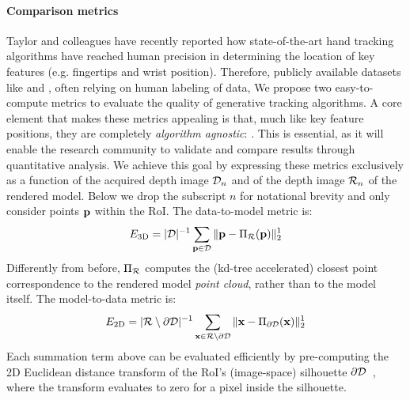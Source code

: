 \paragraph{Comparison metrics}
Taylor and colleagues  have recently reported how state-of-the-art hand tracking algorithms have reached human precision in determining the location of key features (e.g. fingertips and wrist position). 
Therefore, publicly available datasets like \cite{tompson2014real} and \cite{sridhar2013multicam}, often relying on human labeling of data, 
% 
We propose two easy-to-compute metrics to evaluate the quality of generative tracking algorithms. A core element that makes these metrics appealing is that, much like key feature positions, they are completely \emph{algorithm agnostic}: . This is essential, as it will enable the research community to validate and compare results through quantitative analysis. 
% 
We achieve this goal by expressing these metrics exclusively as a function of the acquired depth image $\mathcal{D}_n$ and of the depth image $\mathcal{R}_{n}$ of the rendered model. 
Below we drop the subscript $n$ for notational brevity and only consider points  $\mathbf{p}$ within the RoI.
% 
The data-to-model metric is: %
% 
\begin{equation}
E_\text{3D} = |\mathcal{D}|^{-1} \sum_{\mathbf{p} \in \mathcal{D}} \| \mathbf{p} - \Pi_{\mathcal{R}}(\mathbf{p}) \|_2^1
\label{eq:metric1}
\end{equation}
% 
Differently from before, $\Pi_{\mathcal{R}}$ computes the (kd-tree accelerated) closest point correspondence to the rendered model \emph{point cloud}, rather than to the model itself. 
% 
The model-to-data metric is: %
\begin{eqnarray}
E_\text{2D} = |\mathcal{R} \setminus \partial\mathcal{D}|^{-1} 
\sum_{\mathbf{x} \in \mathcal{R} \setminus \partial\mathcal{D}} \| \mathbf{x} - \Pi_{\partial\mathcal{D}}(\mathbf{x}) \|^1_2
\label{eq:metric2}
\end{eqnarray}
%
Each summation term above can be evaluated efficiently by pre-computing the 2D Euclidean distance transform of the RoI's (image-space) silhouette $\partial \mathcal{D}$~\cite{tagliasacchi2015robust}, where the transform evaluates to zero for a pixel inside the silhouette.
% 

